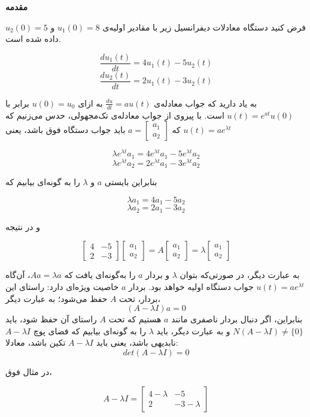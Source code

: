 \textbf{مقدمه}

فرض کنید دستگاه معادلات دیفرانسیل زیر با مقادیر اولیه‌ی $u_1(0)=8$ و $u_2(0)=5$ داده شده است.

$$ \frac{du_1(t)}{dt} = 4u_1(t)-5u_2(t) $$
$$ \frac{du_2(t)}{dt} = 2u_1(t)-3u_2(t) $$

به یاد دارید که جواب معادله‌ی
$ \frac{du}{dt} = au(t) $
به ازای $u(0)=u_0$ برابر با $u(t)=e^{at}u(0)$ است. با پیروی از جواب معادله‌ی تک‌مجهولی، حدس می‌زنیم که $u(t)=ae^{\lambda t}$ که
$a=\begin{bmatrix}
a_1 \\
a_2
\end{bmatrix}$
باید جواب دستگاه فوق باشد، یعنی

$$ \lambda e^{\lambda t} a_1 = 4 e^{\lambda t} a_1 - 5 e^{\lambda t} a_2 $$
$$ \lambda e^{\lambda t} a_2 = 2 e^{\lambda t} a_1 - 3 e^{\lambda t} a_2 $$

بنابراین بایستی $a$ و $\lambda$ را به گونه‌ای بیابیم که

$$ \lambda  a_1 = 4  a_1 - 5 a_2 $$
$$ \lambda a_2 = 2  a_1 - 3 a_2 $$

و در نتیجه

$$ \begin{bmatrix}
4 & -5 \\
2 & -3
\end{bmatrix}
\begin{bmatrix}
a_1 \\
a_2
\end{bmatrix}
=
A
\begin{bmatrix}
a_1 \\
a_2
\end{bmatrix}
=
\lambda
\begin{bmatrix}
a_1 \\
a_2
\end{bmatrix} $$

به عبارت دیگر، در صورتی‌که بتوان $\lambda$ و بردار $a$ را به‌گونه‌ای یافت که $Aa=\lambda a$، آن‌گاه
$u(t)=ae^{\lambda t}$
جواب دستگاه اولیه خواهد بود. بردار $a$ خاصیت ویژه‌ای دارد: راستای این بردار، تحت $A$ حفظ می‌شود؛ به عبارت دیگر،
$$(A-\lambda I)a=0$$
بنابراین، اگر دنبال بردار ناصفری مانند $a$ هستیم که تحت $A$ راستای آن حفظ شود، باید
$N(A-\lambda I)\neq \{0\}$
و به عبارت دیگر، باید $\lambda$ را به گونه‌ای بیابیم که فضای پوچ
$A-\lambda I$
نابدیهی باشد، یعنی باید
$A-\lambda I$
تکین باشد، معادلا:
$$det(A-\lambda I)=0$$

در مثال فوق،

$$A-\lambda I = \begin{bmatrix}
4-\lambda & -5 \\
2 & -3-\lambda
\end{bmatrix} $$

